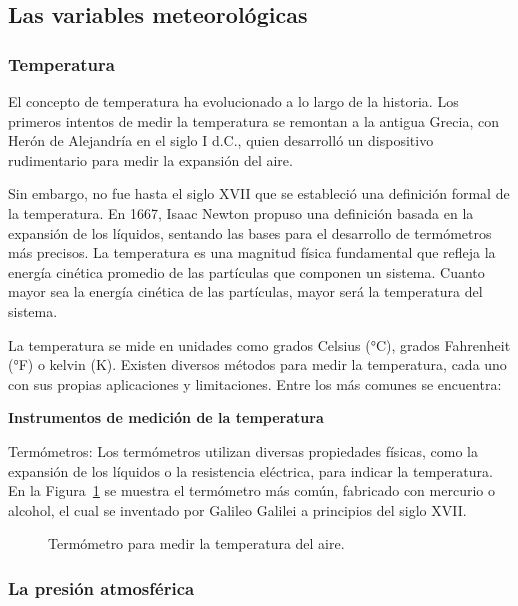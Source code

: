 \documentclass[
  us-letterpaper,
]{scrreprt}
\theoremstyle{plain}
\theoremstyle{definition}
\theoremstyle{definition}
\theoremstyle{remark}
\begin{document}
\subsection{Las variables
meteorológicas}\label{las-variables-meteoroluxf3gicas}

\subsubsection{Temperatura}\label{temperatura}

El concepto de temperatura ha evolucionado a lo largo de la historia.
Los primeros intentos de medir la temperatura se remontan a la antigua
Grecia, con Herón de Alejandría en el siglo I d.C., quien desarrolló un
dispositivo rudimentario para medir la expansión del aire.

Sin embargo, no fue hasta el siglo XVII que se estableció una definición
formal de la temperatura. En 1667, Isaac Newton propuso una definición
basada en la expansión de los líquidos, sentando las bases para el
desarrollo de termómetros más precisos. La temperatura es una magnitud
física fundamental que refleja la energía cinética promedio de las
partículas que componen un sistema. Cuanto mayor sea la energía cinética
de las partículas, mayor será la temperatura del sistema.

La temperatura se mide en unidades como grados Celsius (°C), grados
Fahrenheit (°F) o kelvin (K). Existen diversos métodos para medir la
temperatura, cada uno con sus propias aplicaciones y limitaciones. Entre
los más comunes se encuentra:

\textbf{Instrumentos de medición de la temperatura}

Termómetros: Los termómetros utilizan diversas propiedades físicas, como
la expansión de los líquidos o la resistencia eléctrica, para indicar la
temperatura. En la Figura~\ref{fig-termometro} se muestra el termómetro
más común, fabricado con mercurio o alcohol, el cual se inventado por
Galileo Galilei a principios del siglo XVII.

\begin{figure}


\caption{\label{fig-termometro}Termómetro para medir la temperatura del
aire.}

\end{figure}%

\subsubsection{La presión
atmosférica}\label{la-presiuxf3n-atmosfuxe9rica}
\end{document}
